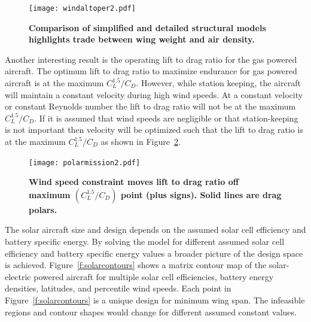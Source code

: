 \begin{figure}[H]
	\begin{center}
	\texttt{[image: windaltoper2.pdf]}
 \caption{\textbf{Comparison of simplified and detailed structural models highlights trade between wing weight and air density.}}
 \label{f:altoper}
	\end{center}
\end{figure}

Another interesting result is the operating lift to drag ratio for the gas powered aircraft.  
The optimum lift to drag ratio to maximize endurance for gas powered aircraft is at the maximum $C_L^{1.5}/C_D$.\cite{br2}  
However, while station keeping, the aircraft will maintain a constant velocity during high wind speeds.  
At a constant velocity or constant Reynolds number the lift to drag ratio will not be at the maximum $C_L^{1.5}/C_D$.  
If it is assumed that wind speeds are negligible or that station-keeping is not important then velocity will be optimized such that the lift to drag ratio is at the maximum $C_L^{1.5}/C_D$ as shown in Figure~\ref{f:polarmission}.

\begin{figure}[H]
	\begin{center}
	\texttt{[image: polarmission2.pdf]}
    \caption{\textbf{Wind speed constraint moves lift to drag ratio off maximum $(C_L^{1.5}/C_D)$ point (plus signs). Solid lines are drag polars.}}
 \label{f:polarmission}
	\end{center}
\end{figure}

The solar aircraft size and design depends on the assumed solar cell efficiency and battery specific energy. 
By solving the model for different assumed solar cell efficiency and battery specific energy values a broader picture of the design space is achieved.   
Figure~\ref{f:solarcontours} shows a matrix contour map of the solar-electric powered aircraft for multiple solar cell efficiencies, battery energy densities, latitudes, and percentile wind speeds.
Each point in Figure~\ref{f:solarcontours} is a unique design for minimum wing span. 
The infeasible regions and contour shapes would change for different assumed constant values. 

